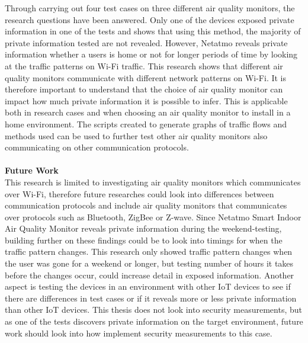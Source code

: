 Through carrying out four test cases on three different air quality monitors, the research questions have been answered. Only one of the devices exposed private information in one of the tests and shows that using this method, the majority of private information tested are not revealed. However, Netatmo reveals private information whether a users is home or not for longer periods of time by looking at the traffic patterns on \gls{Wi-Fi} traffic. This research shows that different air quality monitors communicate with different network patterns on \gls{Wi-Fi}. It is therefore important to understand that the choice of air quality monitor can impact how much private information it is possible to infer. This is applicable both in research cases and when choosing an air quality monitor to install in a home environment. The scripts created to generate graphs of traffic flows and methods used can be used to further test other air quality monitors also communicating on other communication protocols.
\\\\
\textbf{Future Work}
\\
This research is limited to investigating air quality monitors which communicates over \gls{Wi-Fi}, therefore future researches could look into differences between communication protocols and include air quality monitors that communicates over protocols such as Bluetooth, ZigBee or Z-wave. Since Netatmo Smart Indoor Air Quality Monitor reveals private information during the weekend-testing, building further on these findings could be to look into timings for when the traffic pattern changes. This research only showed traffic pattern changes when the user was gone for a weekend or longer, but testing number of hours it takes before the changes occur, could increase detail in exposed information. Another aspect is testing the devices in an environment with other \gls{IoT} devices to see if there are differences in test cases or if it reveals more or less private information than other \gls{IoT} devices. This thesis does not look into security measurements, but as one of the tests discovers private information on the target environment, future work should look into how implement security measurements to this case. 
